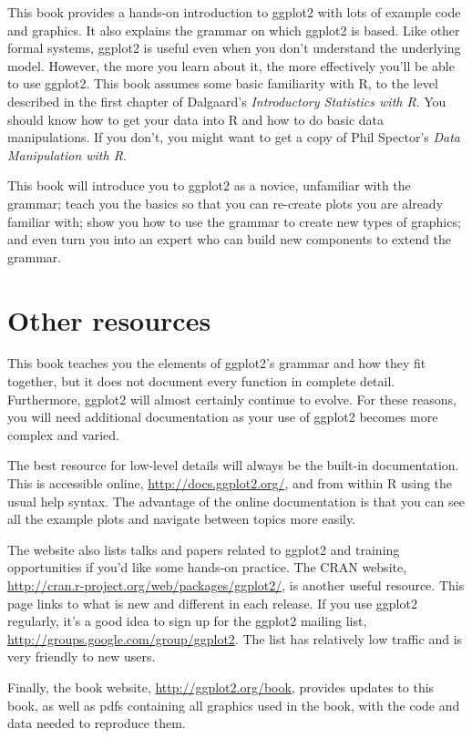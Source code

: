 This book provides a hands-on introduction to ggplot2 with lots of
example code and graphics. It also explains the grammar on which ggplot2
is based. Like other formal systems, ggplot2 is useful even when you
don't understand the underlying model. However, the more you learn about
it, the more effectively you'll be able to use ggplot2. This book
assumes some basic familiarity with R, to the level described in the
first chapter of Dalgaard's \emph{Introductory Statistics with R}. You
should know how to get your data into R and how to do basic data
manipulations. If you don't, you might want to get a copy of Phil
Spector's \emph{Data Manipulation with R}.

This book will introduce you to ggplot2 as a novice, unfamiliar with the
grammar; teach you the basics so that you can re-create plots you are
already familiar with; show you how to use the grammar to create new
types of graphics; and even turn you into an expert who can build new
components to extend the grammar.

\section{Other resources}\label{sec:otherux5fresources}

This book teaches you the elements of ggplot2's grammar and how they fit
together, but it does not document every function in complete detail.
Furthermore, ggplot2 will almost certainly continue to evolve. For these
reasons, you will need additional documentation as your use of ggplot2
becomes more complex and varied.

The best resource for low-level details will always be the built-in
documentation. This is accessible online,
\url{http://docs.ggplot2.org/}, and from within R using the usual help
syntax. The advantage of the online documentation is that you can see
all the example plots and navigate between topics more easily.

The website also lists talks and papers related to ggplot2 and training
opportunities if you'd like some hands-on practice. The CRAN website,
\url{http://cran.r-project.org/web/packages/ggplot2/}, is another useful
resource. This page links to what is new and different in each release.
If you use ggplot2 regularly, it's a good idea to sign up for the
ggplot2 mailing list, \url{http://groups.google.com/group/ggplot2}. The
list has relatively low traffic and is very friendly to new users.

Finally, the book website, \url{http://ggplot2.org/book}, provides
updates to this book, as well as pdfs containing all graphics used in
the book, with the code and data needed to reproduce them.

